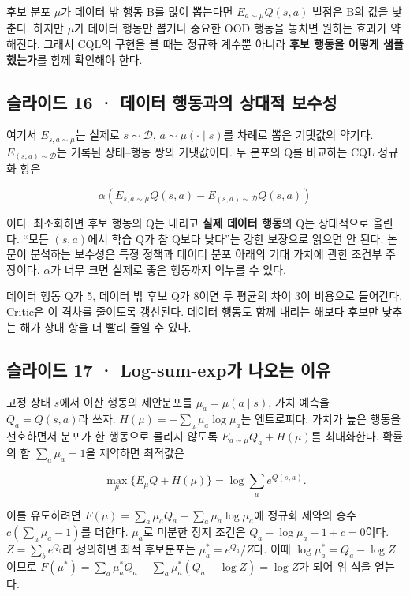 \documentclass[11pt,a4paper]{article}
\begin{document}
후보 분포 $\mu$가 데이터 밖 행동 B를 많이 뽑는다면 $E_{a\sim\mu}Q(s,a)$ 벌점은 B의 값을 낮춘다. 하지만 $\mu$가 데이터 행동만 뽑거나 중요한 OOD 행동을 놓치면 원하는 효과가 약해진다. 그래서 CQL의 구현을 볼 때는 정규화 계수뿐 아니라 \textbf{후보 행동을 어떻게 샘플했는가}를 함께 확인해야 한다.\par

\subsection{슬라이드 16 · 데이터 행동과의 상대적 보수성}

여기서 $E_{s,a\sim\mu}$는 실제로 $s\sim\mathcal D$, $a\sim\mu(\cdot\mid s)$를 차례로 뽑은 기댓값의 약기다. $E_{(s,a)\sim\mathcal D}$는 기록된 상태–행동 쌍의 기댓값이다. 두 분포의 Q를 비교하는 CQL 정규화 항은\par

\[
\alpha\left(E_{s,a\sim\mu}Q(s,a)
-E_{(s,a)\sim\mathcal D}Q(s,a)\right)
\]

이다. 최소화하면 후보 행동의 Q는 내리고 \textbf{실제 데이터 행동}의 Q는 상대적으로 올린다. “모든 $(s,a)$에서 학습 Q가 참 Q보다 낮다”는 강한 보장으로 읽으면 안 된다. 논문이 분석하는 보수성은 특정 정책과 데이터 분포 아래의 기대 가치에 관한 조건부 주장이다. $\alpha$가 너무 크면 실제로 좋은 행동까지 억누를 수 있다.\par

데이터 행동 Q가 5, 데이터 밖 후보 Q가 8이면 두 평균의 차이 3이 비용으로 들어간다. Critic은 이 격차를 줄이도록 갱신된다. 데이터 행동도 함께 내리는 해보다 후보만 낮추는 해가 상대 항을 더 빨리 줄일 수 있다.\par

\subsection{슬라이드 17 · Log-sum-exp가 나오는 이유}

고정 상태 $s$에서 이산 행동의 제안분포를 $\mu_a=\mu(a\mid s)$, 가치 예측을 $Q_a=Q(s,a)$라 쓰자. $H(\mu)=-\sum_a\mu_a\log\mu_a$는 엔트로피다. 가치가 높은 행동을 선호하면서 분포가 한 행동으로 몰리지 않도록 $E_{a\sim\mu}Q_a+H(\mu)$를 최대화한다. 확률의 합 $\sum_a\mu_a=1$을 제약하면 최적값은\par

\[
\max_\mu\{E_\mu Q+H(\mu)\}
=\log\sum_a e^{Q(s,a)}.
\]

이를 유도하려면 $F(\mu)=\sum_a\mu_aQ_a-\sum_a\mu_a\log\mu_a$에 정규화 제약의 승수 $c(\sum_a\mu_a-1)$를 더한다. $\mu_a$로 미분한 정지 조건은 $Q_a-\log\mu_a-1+c=0$이다. $Z=\sum_b e^{Q_b}$라 정의하면 최적 후보분포는 $\mu_a^*=e^{Q_a}/Z$다. 이때 $\log\mu_a^*=Q_a-\log Z$이므로 $F(\mu^*)=\sum_a\mu_a^*Q_a-\sum_a\mu_a^*(Q_a-\log Z)=\log Z$가 되어 위 식을 얻는다.\par
\end{document}
